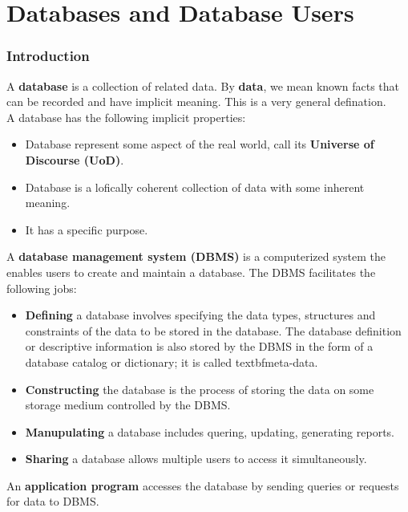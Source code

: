 \chapter{Databases and Database Users}

\subsection{Introduction}

A \textbf{database} is a collection of related data. By
\textbf{data}, we mean known facts that can be recorded and
have implicit meaning. This is a very general defination.\\

A database has the following implicit properties:

\begin{itemize}
    \item Database represent some aspect of the real world,
        call its \textbf{Universe of Discourse (UoD)}.
    \item Database is a lofically coherent collection of data
        with some inherent meaning.
    \item It has a specific purpose.
\end{itemize}

A \textbf{database management system (DBMS)} is a computerized
system the enables users to create and maintain a database. The 
DBMS facilitates the following jobs:

\begin{itemize}
    \item \textbf{Defining} a database involves specifying the
        data types, structures and constraints of the data
        to be stored in the database. The database definition 
        or descriptive information is also
        stored by the DBMS in the form of a database
        catalog or dictionary; it is called
        textbf{meta-data}.
    \item \textbf{Constructing} the database is the process of
        storing the data on some storage medium controlled by the
        DBMS.
    \item \textbf{Manupulating} a database includes
        quering, updating, generating reports.
    \item \textbf{Sharing} a database allows multiple users
        to access it simultaneously.
\end{itemize}

An \textbf{application program} accesses the database by sending
queries or requests for data to DBMS.\\

